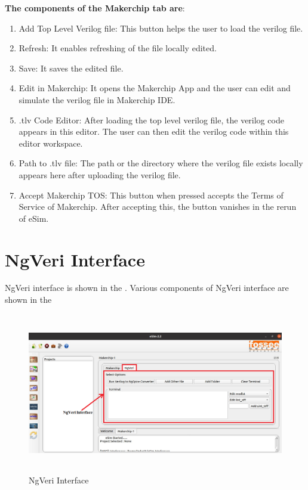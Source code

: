 \noindent \textbf{The components of the Makerchip tab are}:

\begin{enumerate}
\item Add Top Level Verilog file: This button helps the user to load the verilog file. 

\item Refresh: It enables refreshing of the file locally edited. 

\item Save: It saves the edited file. 

\item Edit in Makerchip: It opens the Makerchip App and the user can edit and simulate the verilog file in Makerchip IDE.

\item .tlv Code Editor: After loading the top level verilog file, the verilog code appears in this editor. The user can then edit the verilog code within this editor workspace. 

\item Path to .tlv file: The path or the directory where the verilog file exists locally appears here after uploading the verilog file.

\item Accept Makerchip TOS: This button when pressed accepts the Terms of Service of Makerchip. After accepting this, the button vanishes in the rerun of eSim. 

\end{enumerate}

\pagebreak

\section{NgVeri Interface}

NgVeri interface is shown in the . Various components of NgVeri interface are shown in the 

\begin{figure}[!htp]
\centering
\includegraphics[width = 13cm, height = 7cm]{./NgVeri/ngveriinterface.png}
\caption{NgVeri Interface}
\label{ngveriinterface}
\end{figure}


